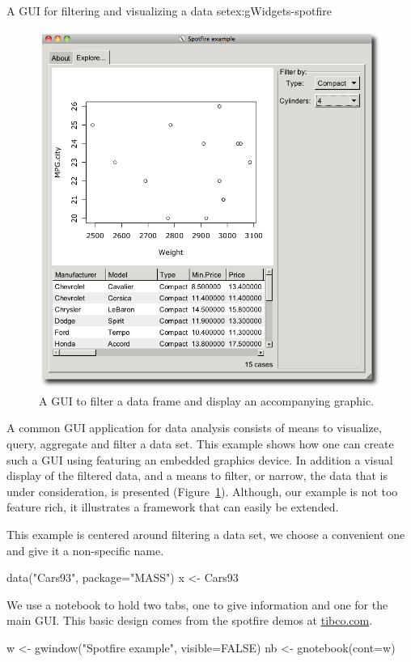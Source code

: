 \begin{example}{A GUI for filtering and visualizing a data set}{ex:gWidgets-spotfire}

\begin{figure}
  \centering
  \includegraphics[width=.6\textwidth]{fig-gWidgets-spotfire-gui}
  \caption{A GUI to filter a data frame and display an accompanying graphic.}
  \label{fig:gWidgets-spotfire-gui}
\end{figure}
A common GUI application for data analysis consists of means to
visualize, query, aggregate and filter a data set. This example shows
how one can create such a GUI using  featuring an
embedded graphics device. In addition a visual display of the filtered
data, and a means to filter, or narrow, the data that is under
consideration, is presented (Figure~\ref{fig:gWidgets-spotfire-gui}).
Although, our example is not too feature rich, it illustrates a
framework that can easily be extended.


This example is centered around filtering a data set, we choose a
convenient one and give it a non-specific name.
\begin{Schunk}
\begin{Sinput}
 data("Cars93", package="MASS")
 x <- Cars93
\end{Sinput}
\end{Schunk}

We use a notebook to hold two tabs, one to give information and one
for the main GUI. This basic design comes from the spotfire demos at \url{tibco.com}.
\begin{Schunk}
\begin{Sinput}
 w <- gwindow("Spotfire example", visible=FALSE)
 nb <- gnotebook(cont=w)
\end{Sinput}
\end{Schunk}



\end{example}
